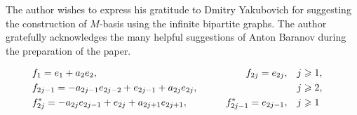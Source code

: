 \documentclass[12pt]{amsart}
\begin{document}
  The author wishes to express his gratitude to Dmitry Yakubovich for suggesting the construction of $M$-basis using the infinite bipartite graphs.
  The author gratefully acknowledges the many helpful suggestions of Anton Baranov during the preparation of the paper.
  \begin{example}
    \label{lw-sys}
    \begin{align*}
      &f_1 = e_1 + a_2 e_2, \qquad &f_{2j}=e_{2j}, \quad&j \geq 1,&\\
      &f_{2j-1}=-a_{2j-1}e_{2j-2} + e_{2j-1} + a_{2j}e_{2j}, \qquad &\makebox[5em]{} \quad&j \geq 2,&\\
      &f^*_{2j}=-a_{2j}e_{2j-1}+e_{2j}+a_{2j+1}e_{2j+1}, \qquad &f^*_{2j-1}=e_{2j-1}, \quad&j \geq 1&
    \end{align*}
  \end{example}
\end{document}
